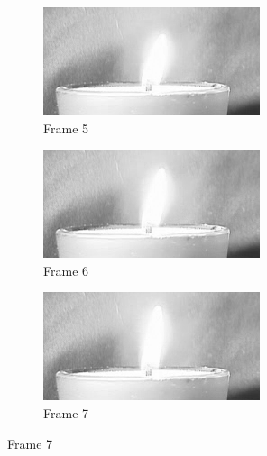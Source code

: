 \documentclass{article}
\begin{document}
\begin{enumerate}
\begin{figure}[h!]
    \vskip 0.2cm
    \begin{subfigure}{0.32\textwidth}
        \centering
        \includegraphics[width=\linewidth]{../images/flame/frame = 5.png}
        \caption{Frame 5}
    \end{subfigure}
    \begin{subfigure}{0.32\textwidth}
        \centering
        \includegraphics[width=\linewidth]{../images/flame/frame = 6.png}
        \caption{Frame 6}
    \end{subfigure}
    \begin{subfigure}{0.32\textwidth}
        \centering
        \includegraphics[width=\linewidth]{../images/flame/frame = 7.png}
        \caption{Frame 7}
    \end{subfigure}


\end{figure}
\end{enumerate}
\end{document}
